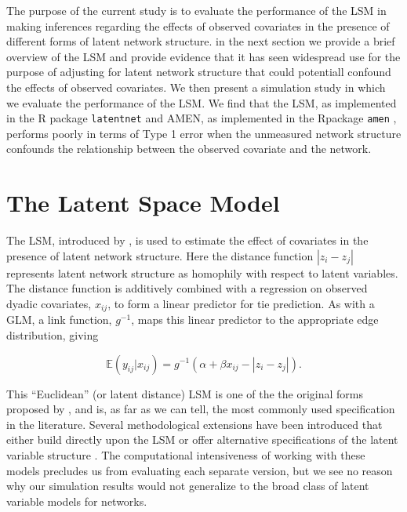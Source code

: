 \documentclass[11pt]{article}
\newcommand{\R}{\textsf{R}\space} %
\begin{document}
The purpose of the current study is to evaluate the performance of the LSM in making inferences regarding the effects of observed covariates in the presence of different forms of latent network structure. in the next section we provide a brief overview of the LSM and provide evidence that it has seen widespread use for the purpose of adjusting for latent network structure that could potentiall confound the effects of observed covariates. We then present a simulation study in which we evaluate the performance of the LSM. We find that the LSM, as
implemented in the \R \citep{R} package \texttt{latentnet}
\citep{latentnet} and AMEN, as implemented in the \R package \texttt{amen} \citep{amen}, performs poorly in
terms of Type 1 error when the unmeasured network structure confounds
the relationship between the observed covariate and the network.



\section{The Latent Space Model}

The LSM, introduced by \citet{hoff2002latent}, is used to estimate the
effect of covariates in the presence of latent network structure. Here
the distance function $|z_i - z_j|$ represents latent network
structure as homophily with respect to latent variables.  The distance
function is additively combined with a regression on observed dyadic
covariates, $x_{ij}$, to form a linear predictor for tie prediction.
As with a GLM, a link function, $g^{-1}$, maps this linear predictor
to the appropriate edge distribution, giving

$$\mathbb{E}(y_{ij} | x_{ij}) = g^{-1}(\alpha + \beta x_{ij} - |z_i - z_j|).$$

This ``Euclidean'' (or latent distance) LSM is one of the the original forms proposed by
\citet{hoff2002latent}, and is, as far as we can tell, the most commonly
used specification in the literature. Several methodological extensions have been introduced that either build directly upon the LSM or offer alternative specifications of the latent variable structure \citep[e.g., ][]{hoff2009multiplicative,westveld2011mixed,handcock2007model,hoff2008modeling,hoff2015dyadic}. The computational intensiveness of working with these models precludes us from evaluating each separate version, but we see no reason why our simulation results would not generalize to the broad class of latent variable models for networks.
\end{document}
